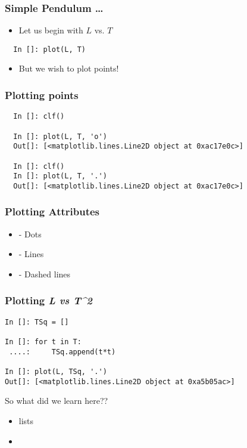 \documentclass[14pt,compress]{beamer}
\newcommand{\kwrd}[1]{ \texttt{\textbf{\color{blue}{#1}}}  }
\begin{document}
\begin{frame}[fragile]
\frametitle{Simple Pendulum \ldots}
\begin{itemize}
\item Let us begin with $L$ vs. \alert{$T$}
\end{itemize}
\begin{lstlisting}
  In []: plot(L, T)
\end{lstlisting}
\begin{itemize}
\item But we wish to plot points!
\end{itemize}
\end{frame}

\begin{frame}[fragile]
\frametitle{Plotting points}
\begin{lstlisting}
  In []: clf()

  In []: plot(L, T, 'o')
  Out[]: [<matplotlib.lines.Line2D object at 0xac17e0c>]

  In []: clf()
  In []: plot(L, T, '.')
  Out[]: [<matplotlib.lines.Line2D object at 0xac17e0c>]
\end{lstlisting}
\end{frame}

\begin{frame}[fragile]
\frametitle{Plotting Attributes}
\begin{itemize}
  \item \kwrd{'o'} - Dots
  \item \kwrd{'-'} - Lines
  \item \kwrd{'- -'} - Dashed lines
\end{itemize}
\end{frame}

\begin{frame}[fragile]
\frametitle{Plotting \it{L} vs \it{T^2}}
\begin{lstlisting}
In []: TSq = []

In []: for t in T:
 ....:     TSq.append(t*t)

In []: plot(L, TSq, '.')
Out[]: [<matplotlib.lines.Line2D object at 0xa5b05ac>]
\end{lstlisting}
\end{frame}

\begin{frame}{So what did we learn here??}
  \begin{itemize}
    \item lists
    \item \alert{\kwrd{for}}
  \end{itemize}
\end{frame}
\end{document}
